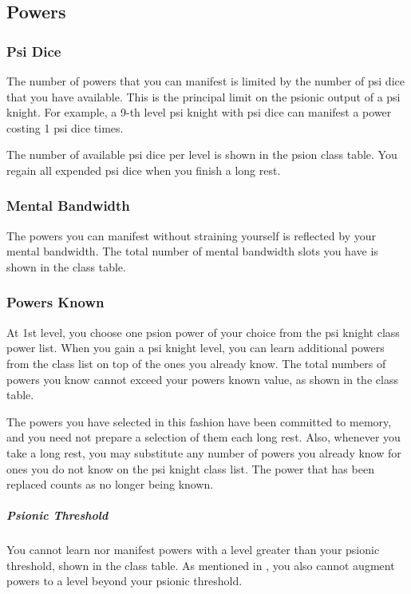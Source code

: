 \subsection{Powers}
\subsubsection{Psi Dice}
The number of powers that you can manifest
is limited by the number of psi dice that
you have available.
This is the principal limit on the psionic output of a psi knight.
For example, a 9-th level psi knight with {\pklvlnine} psi dice
can manifest a power costing 1 psi dice {\pklvlnine} times.

The number of available psi dice per level
is shown in the psion class table.
You regain all expended psi dice when you finish
a long rest.

\subsubsection{Mental Bandwidth}
The powers you can manifest without straining yourself
is reflected by your mental bandwidth.
The total number of mental bandwidth slots you have
is shown in the class table.

\subsubsection{Powers Known}
At 1st level,
you choose one psion power of your choice
from the psi knight class power list.
When you gain a psi knight level,
you can learn additional powers from the class list
on top of the ones you already know.
The total numbers of powers you know cannot
exceed your powers known value,
as shown in the class table.

The powers you have selected in this fashion have been committed
to memory, and you need not prepare a selection of them each long rest.
Also,
whenever you take a long rest,
you may substitute any number of powers you already know
for ones you do not know on the psi knight class list.
The power that has been replaced counts as no longer being known.

\subparagraph{Psionic Threshold}
You cannot learn nor manifest powers with a level
greater than your psionic threshold,
shown in the class table.
As mentioned in ,
you also cannot augment powers to a level
beyond your psionic threshold.

